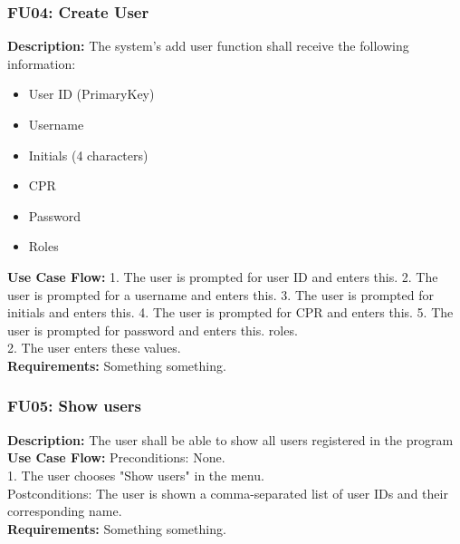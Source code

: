 \begin{adjustwidth}{2em}{0pt}
    \subsubsection*{FU04: Create User}
    \begin{adjustwidth}{1em}{0pt}
        \textbf{Description:}
        The system's add user function shall receive the following information:
        \begin{multicols}{2}
            \begin{itemize}
                \item User ID (PrimaryKey)
                \item Username
                \item Initials (4 characters)
                \item CPR
                \item Password
                \item Roles
            \end{itemize}
        \end{multicols}
        \textbf{Use Case Flow:}
        1. The user is prompted for user ID and enters this.
        2. The user is prompted for a username and enters this.
        3. The user is prompted for initials and enters this.
        4. The user is prompted for CPR and enters this.
        5. The user is prompted for password and enters this.
        roles.\\
        2. The user enters these values.\\
        \textbf{Requirements:}
        Something something.
    \end{adjustwidth}
    
    \subsubsection*{FU05: Show users}
    \begin{adjustwidth}{1em}{0pt}
        \textbf{Description:}
        The user shall be able to show all users registered in the program\\
        \textbf{Use Case Flow:}
        Preconditions: None.\\
        1. The user chooses "Show users" in the menu.\\
        Postconditions: The user is shown a comma-separated list of user IDs and their corresponding name.\\
        \textbf{Requirements:}
        Something something.
    \end{adjustwidth}
    

\end{adjustwidth}

